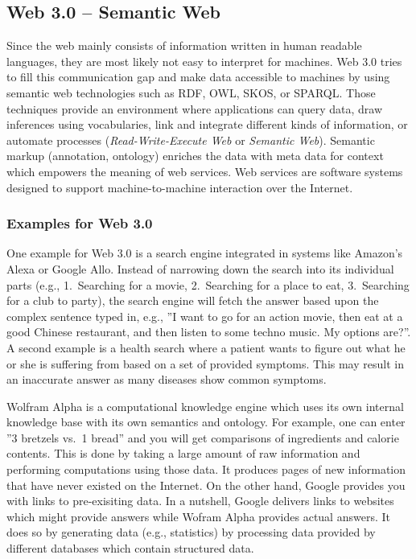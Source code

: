 \documentclass[a4paper]{article}
\begin{document}
\subsection*{Web 3.0 -- Semantic Web}
Since the web mainly consists of information written in human readable languages, they are most likely not easy to interpret for machines.
Web 3.0 tries to fill this communication gap and make data accessible to machines by using semantic web technologies such as RDF, OWL, SKOS, or SPARQL.
Those techniques provide an environment where applications can query data, draw inferences using vocabularies, link and integrate different kinds of information, or automate processes (\emph{Read-Write-Execute Web} or \emph{Semantic Web}).
Semantic markup (annotation, ontology) enriches the data with meta data for context which empowers the meaning of web services.
Web services are software systems designed to support machine-to-machine interaction over the Internet.

\subsubsection*{Examples for Web 3.0}
One example for Web 3.0 is a search engine integrated in systems like Amazon's Alexa or Google Allo.
Instead of narrowing down the search into its individual parts (e.g., 1.~Searching for a movie, 2.~Searching for a place to eat, 3.~Searching for a club to party),
the search engine will fetch the answer based upon the complex sentence typed in, e.g., ''I want to go for an action movie, then eat at a good Chinese restaurant, and then listen to some techno music. My options are?''.
A second example is a health search where a patient wants to figure out what he or she is suffering from based on a set of provided symptoms.
This may result in an inaccurate answer as many diseases show common symptoms.

Wolfram Alpha is a computational knowledge engine which uses its own internal knowledge base with its own semantics and ontology.
For example, one can enter ''3 bretzels vs.\ 1 bread'' and you will get comparisons of ingredients and calorie contents.
This is done by taking a large amount of raw information and performing computations using those data.
It produces pages of new information that have never existed on the Internet.
On the other hand, Google provides you with links to pre-exisiting data.
In a nutshell, Google delivers links to websites which might provide answers while Wofram Alpha provides actual answers.
It does so by generating data (e.g., statistics) by processing data provided by different databases which contain structured data.
\end{document}
